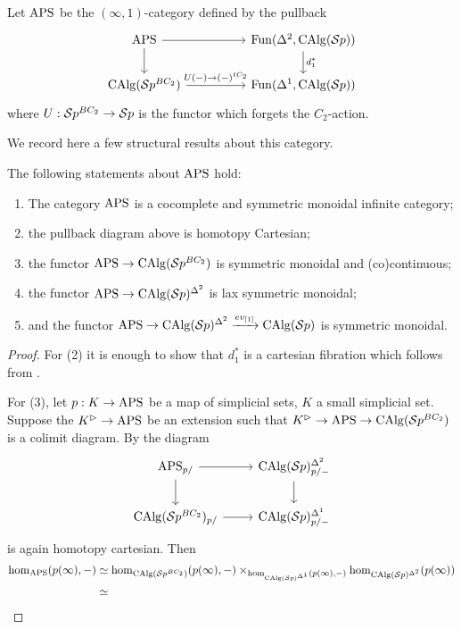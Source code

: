 \begin{defn}
Let $\mathrm{APS}$ be the $(\infty,1)$-category defined by the pullback \[
\begin{tikzcd}
\aps \arrow[rr]\arrow[d] & & \operatorname{Fun}(\Delta^2, \calg(\Sp))\arrow[d,"d_1^*"]\\
\calg(\Sp^{BC_2})\arrow[rr,"U(-)\to (-)^{tC_2}"] & & \operatorname{Fun}(\Delta^1, \calg(\Sp))
\end{tikzcd}
\] where $U:\mathcal{S}p^{BC_2}\to \mathcal{S}p$ is the functor which forgets the $C_2$-action.
\end{defn}

We record here a few structural results about this category.

\begin{thm}
The following statements about $\mathrm{APS}$ hold:
\begin{enumerate}
\item The category $\mathrm{APS}$ is a cocomplete and symmetric monoidal infinite category;
\item the pullback diagram above is homotopy Cartesian;
\item the functor $\mathrm{APS}\to \operatorname{CAlg}(\mathcal{S}p^{BC_2})$ is symmetric monoidal and (co)continuous;
\item the functor $\mathrm{APS}\to \operatorname{CAlg}(\mathcal{S}p)^{\Delta^2}$ is lax symmetric monoidal;
\item and the functor $\mathrm{APS}\to \operatorname{CAlg}(\mathcal{S}p)^{\Delta^2}\xrightarrow{ev_{[1]}} \operatorname{CAlg}(\mathcal{S}p)$ is symmetric monoidal.
\end{enumerate}
\end{thm}
\begin{proof}
    For (2) it is enough to show that $d_1^*$ is a cartesian fibration which follows from \cite[Corollary 2.4.6.5]{HTT}. 

    For (3), let $p:K\to \mathrm{APS}$ be a map of simplicial sets, $K$ a small simplicial set. Suppose the $K^\vartriangleright\to \mathrm{APS}$ be an extension such that $K^\vartriangleright\to \mathrm{APS}\to \operatorname{CAlg}(\mathcal{S}p^{BC_2})$ is a colimit diagram. By \cite[Proposition 2.4.3.2]{HTT} the diagram \[\begin{tikzcd}
        \aps_{p/}\arrow[r]\arrow[d] &\calg(\Sp)^{\Delta^2}_{p/-}\arrow[d]\\
        \calg(\Sp^{BC_2})_{p/}\arrow[r] & \calg(\Sp)^{\Delta^1}_{p/-}
    \end{tikzcd}\] is again homotopy cartesian. Then 
    \begin{align*}
        \hom_{\mathrm{APS}}(p(\infty), -)&\simeq \hom_{\operatorname{CAlg}(\mathcal{S}p^{BC_2})}(p(\infty), -)\times_{\hom_{\operatorname{CAlg}(\mathcal{S}p)^{\Delta^1}}(p(\infty),-)}\hom_{\operatorname{CAlg}(\mathcal{S}p)^{\Delta^2}}(p(\infty))\\
        &\simeq 
    \end{align*}
\end{proof}

